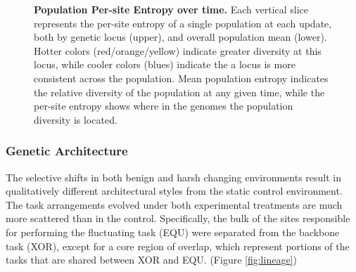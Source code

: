\documentclass[letterpaper]{article}
\begin{document}
\begin{figure}[h!]
\begin{center}
\caption{\textbf{Population Per-site Entropy over time.} Each vertical slice represents the per-site entropy of %
a single
population at each update, both by genetic locus (upper), and overall population mean (lower). Hotter colors (red/orange/yellow) indicate greater diversity at this locus, while cooler colors (blues) indicate the a locus is more consistent across the population. Mean population entropy indicates the relative diversity of the population at any given time, while the per-site entropy shows where in the genomes the population diversity is located.   %
}\label{fig:entropy}
\end{center}
\end{figure}

\subsubsection{Genetic Architecture}
The selective shifts in both benign and harsh changing environments result in qualitatively different architectural styles from the static control environment. The task arrangements evolved under both experimental treatments are much more scattered than in the control. 
Specifically,
the bulk of the sites responsible for performing the fluctuating task (EQU) were separated from the backbone task (XOR), except for a core region of overlap, which represent portions of the tasks that are shared between XOR and EQU. (Figure \ref{fig:lineage})
\end{document}
